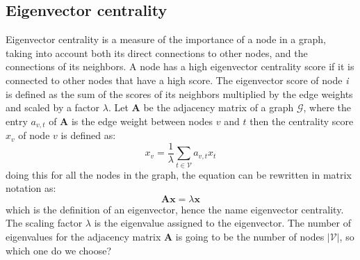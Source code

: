 \documentclass[12pt]{article}
\numberwithin{equation}{section}
\begin{document}
\begin{spacing}{1.5}
	\subsection{Eigenvector centrality}
	Eigenvector centrality is a measure of the importance of a node in a graph, taking into account both its direct connections to other nodes, and the connections of its neighbors. A node has a high eigenvector centrality score if it is connected to other nodes that have a high score. The eigenvector score of node \textit{i} is defined as the sum of the scores of its neighbors multiplied by the edge weights and scaled by a factor $\lambda$. Let $\mathbf{A}$ be the adjacency matrix of a graph $\mathcal{G}$, where the entry $a_{v,t}$ of $\mathbf{A}$ is the edge weight between nodes $v$ and $t$ then the centrality score $x_v$ of node $v$ is defined as:
	\begin{equation}\label{eigenvector_1}
		x_v = \frac{1}{\lambda} \sum_{t \in \mathcal{V}} a_{v,t} x_t
	\end{equation}
	doing this for all the nodes in the graph, the equation can be rewritten in matrix notation as:
	\begin{equation}\label{eigenvector_2}
		\mathbf{A}\mathbf{x} = \lambda \mathbf{x}
	\end{equation}
	which is the definition of an eigenvector, hence the name eigenvector centrality. The scaling factor $\lambda$ is the eigenvalue assigned to the eigenvector. The number of eigenvalues for the adjacency matrix $\mathbf{A}$ is going to be the number of nodes $|\mathcal{V}|$, so which one do we choose?
	

\end{spacing}
\end{document}
